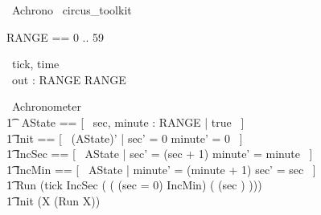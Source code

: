 \documentclass{article}
\begin{document}
\begin{zsection}
	\SECTION\ Achrono \parents\ circus\_toolkit
\end{zsection}

\begin{zed}
	RANGE == 0 .. 59
\end{zed}

\begin{circus}
	\circchannel\ tick, time \\
	\circchannel\ out : RANGE \cross RANGE
\end{circus}

\begin{circus}
	\circprocess\ Achronometer \circdef \circbegin \\
    	\t1 \circstate\ AState == [~ sec, minute : RANGE | true ~] \\
    	\t1	Init == [~ (AState)' | sec' = 0 \land minute' = 0 ~] \\
		\t1 IncSec == [~ \Delta AState | sec' = (sec + 1)  \land minute' = minute ~] \\
		\t1 IncMin == [~ \Delta AState | minute' = (minute + 1)  \land sec' = sec ~] \\
		\t1 Run \circdef (tick \then IncSec \circseq (
        	( \lcircguard (sec = 0) \rcircguard \circguard IncMin) 
 	       	\extchoice 
       		( \lcircguard (sec ) \rcircguard \circguard \Skip))) \\
	\t1 \circspot Init \circseq (\circmu X \circspot (Run \circseq X)) \\
	\circend
\end{circus}
\end{document}
